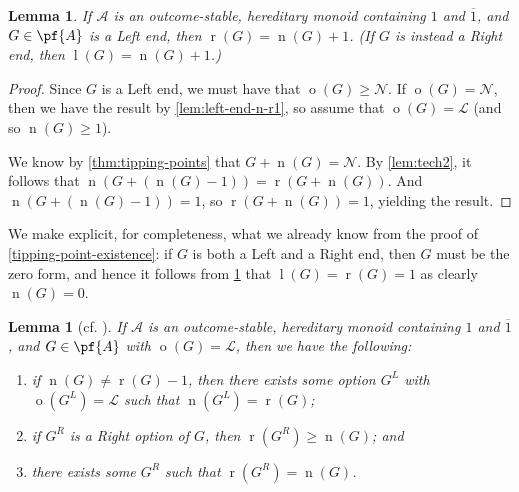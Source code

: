 \documentclass[11pt]{article}
\newtheorem{lemma}[theorem]{Lemma}
\theoremstyle{definition}
\DeclareMathOperator{\outcome}{o}
\newcommand{\set}[1]{\mathcal{#1}}
\DeclareMathOperator{\ltp}{l}
\DeclareMathOperator{\ntp}{n}
\DeclareMathOperator{\rtp}{r}
\begin{document}
\begin{lemma}
    \label{prop:ends-tp}
    If $\set{A}$ is an outcome-stable, hereditary monoid containing $1$ and
    $\overline{1}$, and $G\in\pf{A}$ is a Left end, then $\rtp(G)=\ntp(G)+1$.
    (If $G$ is instead a Right end, then $\ltp(G)=\ntp(G)+1$.)
\end{lemma}

\begin{proof}
    Since $G$ is a Left end, we must have that $\outcome(G)\geq\mathscr{N}$. If
    $\outcome(G)=\mathscr{N}$, then we have the result by
    \cref{lem:left-end-n-r1}, so assume that $\outcome(G)=\mathscr{L}$ (and so
    $\ntp(G)\geq1$).

    We know by \cref{thm:tipping-points} that $G+\ntp(G)=\mathscr{N}$. By
    \cref{lem:tech2}, it follows that $\ntp(G+(\ntp(G)-1))=\rtp(G+\ntp(G))$.
    And $\ntp(G+(\ntp(G)-1))=1$, so $\rtp(G+\ntp(G))=1$, yielding the result.
\end{proof}

We make explicit, for completeness, what we already know from the proof of
\cref{tipping-point-existence}: if $G$ is both a Left and a Right end, then $G$
must be the zero form, and hence it follows from \cref{prop:ends-tp} that
$\ltp(G)=\rtp(G)=1$ as clearly $\ntp(G)=0$.

\begin{lemma}[cf. {\cite[Lemmas 8--9 on p.~7]{milley.renault:invertible}}]
    \label{lem:tech3}
    If $\set{A}$ is an outcome-stable, hereditary monoid containing $1$ and
    $\overline{1}$, and $G\in\pf{A}$ with $\outcome(G)=\mathscr{L}$, then we
    have the following:
    \begin{enumerate}
        \item
            if $\ntp(G)\neq\rtp(G)-1$, then there exists some option $G^L$ with
            $\outcome(G^L)=\mathscr{L}$ such that $\ntp(G^L)=\rtp(G)$;
        \item
            if $G^R$ is a Right option of $G$, then $\rtp(G^R)\geq\ntp(G)$; and
        \item
            there exists some $G^R$ such that $\rtp(G^R)=\ntp(G)$.
    \end{enumerate}
\end{lemma}
\end{document}
